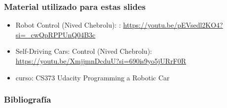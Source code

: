 \begin{frame}
    \frametitle{Material utilizado para estas slides}
    
    \begin{itemize}
        \item Robot Control (Nived Chebrolu):        : \url{https://youtu.be/pEVsedl2KO4?si=_cwQpRPPUnQ04B3c}
        \item Self-Driving Cars: Control (Nived Chebrolu): \url{https://youtu.be/XmjjmnDcduU?si=690is9yo5jURrF0R}
        \item curso: CS373 Udacity Programming a Robotic Car
    \end{itemize}
    
\end{frame}

\begin{frame}
	\frametitle{Bibliografía}
	\nocite{hartley2003multiple}
	
	\printbibliography
	
\end{frame}